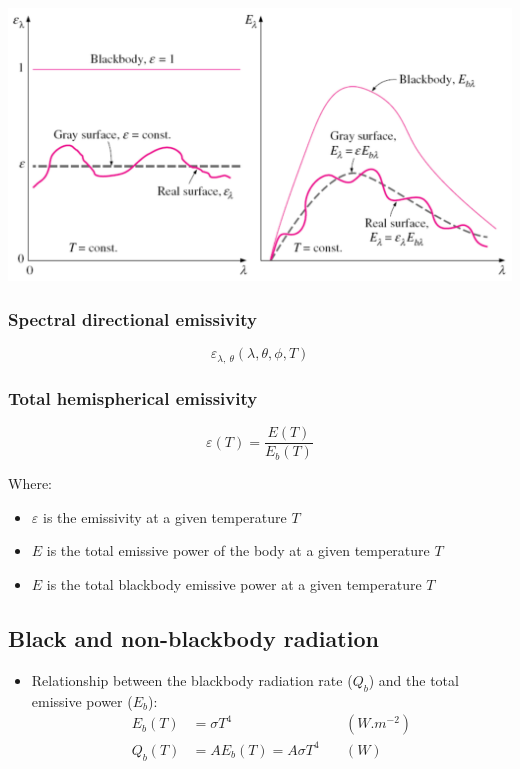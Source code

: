\documentclass[11pt]{article}
\begin{document}
\begin{center}
\includegraphics[width=.9\linewidth]{./images/gray-and-diffuse-surfaces-graph.png}
\end{center}
\subsubsection{Spectral directional emissivity}
\label{sec:org6e1b9c8}
\[\varepsilon_{\lambda, \ \theta} (\lambda, \theta, \phi, T)\]
\subsubsection{Total hemispherical emissivity}
\label{sec:org9bb5648}
\[\varepsilon (T) = \frac{E(T)}{E_b(T)}\]

Where:
\begin{itemize}
\item \(\varepsilon\) is the emissivity at a given temperature \(T\)
\item \(E\) is the total emissive power of the body at a given temperature \(T\)
\item \(E\) is the total blackbody emissive power at a given temperature \(T\)
\end{itemize}
\subsection{Black and non-blackbody radiation}
\label{sec:org5a77dd5}
\begin{itemize}
\item Relationship between the blackbody radiation rate (\(Q_b\)) and the total emissive power (\(E_b\)):
\begin{align*}
E_b (T) &= \sigma T^4 \quad & (\unit{W.m^{-2}}) \\
Q_b (T) &= AE_b (T) = A \sigma T^4 \quad & (\unit{W})
\end{align*}
\end{itemize}
\end{document}

